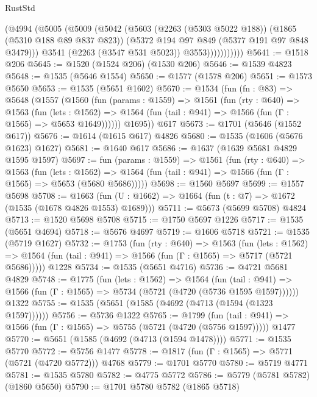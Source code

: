 \begin{lexlean}{RustStd}
\begin{coremodule}
                  (@4994
                    (@5005
                      (@5009
                        (@5042
                          (@5603
                            (@2263 (@5303 @5022 @188))
                            (@1865 (@5310 @188 @89 @837 @823))
                            (@5372 @194 @97 @849 (@5377 @191 @97 @848 @3479)))
                          @3541
                          (@2263 (@3547 @531 @5023))
                          @3553)))))))))))
@5641 := @1518 @206
@5645 := @1520 (@1524 @206) (@1530 @206)
@5646 := @1539 @4823
@5648 := @1535 (@5646 @1554)
@5650 := @1577 (@1578 @206)
@5651 := @1573 @5650
@5653 := @1535 (@5651 @1602)
@5670 := @1534
    (fun (fn : @83) =>
    @5648
      (@1557
        (@1560
          (fun (params : @1559) =>
          @1561
            (fun (rty : @640) =>
            @1563
              (fun (lets : @1562) =>
              @1564 (fun (tail : @941) => @1566 (fun (Γ : @1565) => @5653 @1649))))))
        @1695))
    @617
@5673 := @1701 (@5646 (@1552 @617))
@5676 := @1614 (@1615 @617) @4826
@5680 := @1535 (@1606 (@5676 @1623) @1627)
@5681 := @1640 @617
@5686 := @1637 (@1639 @5681 @4829 @1595 @1597)
@5697 := fun (params : @1559) =>
  @1561
    (fun (rty : @640) =>
    @1563
      (fun (lets : @1562) =>
      @1564 (fun (tail : @941) => @1566 (fun (Γ : @1565) => @5653 (@5680 @5686)))))
@5698 := @1560 @5697
@5699 := @1557 @5698
@5708 := @1663 (fun (U : @1662) => @1664 (fun (t : @7) => @1672 (@1535 (@1678 @4826 @1553) @1689)))
@5711 := @5673 (@5699 @5708) @4824
@5713 := @1520 @5698 @5708
@5715 := @1750 @5697 @1226
@5717 := @1535 (@5651 @4694)
@5718 := @5676 @4697
@5719 := @1606 @5718
@5721 := @1535 (@5719 @1627)
@5732 := @1753
    (fun (rty : @640) =>
    @1563
      (fun (lets : @1562) =>
      @1564 (fun (tail : @941) => @1566 (fun (Γ : @1565) => @5717 (@5721 @5686)))))
    @1228
@5734 := @1535 (@5651 @4716)
@5736 := @4721 @5681 @4829
@5748 := @1775
    (fun (lets : @1562) =>
    @1564
      (fun (tail : @941) => @1566 (fun (Γ : @1565) => @5734 (@5721 (@4720 (@5736 @1595 @1597))))))
    @1322
@5755 := @1535 (@5651 (@1585 (@4692 (@4713 (@1594 (@1323 @1597))))))
@5756 := @5736 @1322
@5765 := @1799
    (fun (tail : @941) => @1566 (fun (Γ : @1565) => @5755 (@5721 (@4720 (@5756 @1597)))))
    @1477
@5770 := @5651 (@1585 (@4692 (@4713 (@1594 @1478))))
@5771 := @1535 @5770
@5772 := @5756 @1477
@5778 := @1817 (fun (Γ : @1565) => @5771 (@5721 (@4720 @5772))) @4768
@5779 := @1701 @5770
@5780 := @5719 @4771
@5781 := @1535 @5780
@5782 := @4775 @5772
@5786 := @5779 (@5781 @5782) (@1860 @5650)
@5790 := @1701 @5780 @5782 (@1865 @5718)

\end{coremodule}
\end{lexlean}

